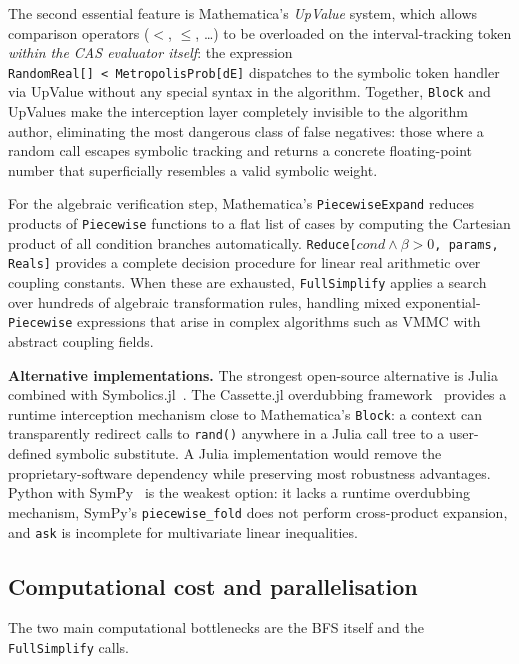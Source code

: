 \documentclass[twocolumn,10pt]{article}
\begin{document}
The second essential feature is Mathematica's \emph{UpValue} system, which
allows comparison operators ($<$, $\leq$, \ldots) to be overloaded on the
interval-tracking token \emph{within the CAS evaluator itself}: the
expression \texttt{RandomReal[]~<~MetropolisProb[dE]} dispatches to
the symbolic token handler via UpValue without any special syntax in the
algorithm.  Together, \texttt{Block} and UpValues make the interception layer
completely invisible to the algorithm author, eliminating the most dangerous
class of false negatives: those where a random call escapes symbolic tracking
and returns a concrete floating-point number that superficially resembles a
valid symbolic weight.

For the algebraic verification step, Mathematica's \texttt{PiecewiseExpand}
reduces products of \texttt{Piecewise} functions to a flat list of cases by
computing the Cartesian product of all condition branches automatically.
\texttt{Reduce[$\mathit{cond}\wedge\beta>0$, params, Reals]}
provides a complete decision procedure for linear real arithmetic over
coupling constants.  When these are exhausted, \texttt{FullSimplify} applies
a search over hundreds of algebraic transformation rules, handling mixed
exponential-\texttt{Piecewise} expressions that arise in complex algorithms
such as VMMC with abstract coupling fields.

\medskip\noindent\textbf{Alternative implementations.}
The strongest open-source alternative is Julia combined with
Symbolics.jl~\cite{Gowda2021}.  The Cassette.jl overdubbing
framework~\cite{Cassette} provides a runtime interception mechanism close to
Mathematica's \texttt{Block}: a context can transparently redirect calls to
\texttt{rand()} anywhere in a Julia call tree to a user-defined symbolic
substitute.  A Julia implementation would remove the proprietary-software
dependency while preserving most robustness advantages.  Python with
SymPy~\cite{Meurer2017} is the weakest option: it lacks a runtime overdubbing
mechanism, SymPy's \texttt{piecewise\_fold} does not perform cross-product
expansion, and \texttt{ask} is incomplete for multivariate linear
inequalities.

\subsection{Computational cost and parallelisation}
\label{sec:parallel}

The two main computational bottlenecks are the BFS itself and the
\texttt{FullSimplify} calls.
\end{document}
